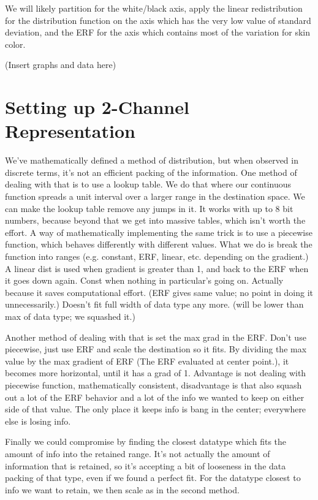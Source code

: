 \documentclass[10pt,a4paper]{article}
\begin{document}
We will likely partition for the white/black axis, apply the linear redistribution for the distribution function on the axis which has the very low value of standard deviation, and the ERF for the axis which contains most of the variation for skin color.

(Insert graphs and data here)

\section{Setting up 2-Channel Representation}\label{sec:SettingUp2-ChannelRepresentation}
We've mathematically defined a method of distribution, but when observed in discrete terms, it's not an efficient packing of the information. One method of dealing with that is to use a lookup table. We do that where our continuous function spreads a unit interval over a larger range in the destination space. We can make the lookup table remove any jumps in it. It works with up to 8 bit numbers, because beyond that we get into massive tables, which isn't worth the effort. A way of mathematically implementing the same trick is to use a piecewise function, which behaves differently with different values. What we do is break the function into ranges (e.g. constant, ERF, linear, etc. depending on the gradient.) A linear dist is used when gradient is greater than 1, and back to the ERF when it goes down again. Const when nothing in particular's going on. Actually because it saves computational effort. (ERF gives same value; no point in doing it unnecessarily.) Doesn't fit full width of data type any more. (will be lower than max of data type; we squashed it.)

Another method of dealing with that is set the max grad in the ERF. Don't use piecewise, just use ERF and scale the destination so it fits. By dividing the max value by the max gradient of ERF (The ERF evaluated at center point.), it becomes more horizontal, until it has a grad of 1. Advantage is not dealing with piecewise function, mathematically consistent, disadvantage is that also squash out a lot of the ERF behavior and a lot of the info we wanted to keep on either side of that value. The only place it keeps info is bang in the center; everywhere else is losing info. 

Finally we could compromise by finding the closest datatype which fits the amount of info into the retained range. It's not actually the amount of information that is retained, so it's accepting a bit of looseness in the data packing of that type, even if we found a perfect fit. For the datatype closest to info we want to retain, we then scale as in the second method. 
\end{document}

